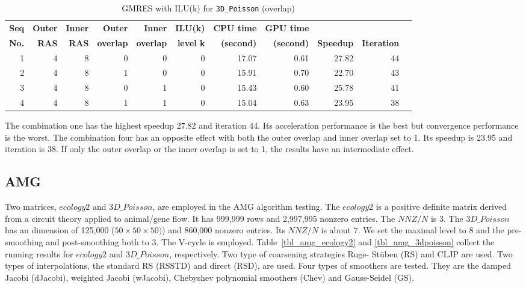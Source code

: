 \documentclass[runningheads,a4paper]{llncs}
\begin{document}
{\begin{table}[!htb]
\centering
\caption{GMRES with ILU(k) for \texttt{3D\_Poisson} (overlap)}
\begin{tabular}{|r|r|r|r|r|r|r|r|r|r|r|} \hline
\bfseries Seq & \bfseries Outer & \bfseries Inner & \bfseries Outer & \bfseries Inner & \bfseries ILU(k) & \bfseries CPU time  & \bfseries GPU time  & \bfseries        & \bfseries  \\
\bfseries No. & \bfseries RAS   & \bfseries RAS & \bfseries overlap & \bfseries overlap & \bfseries level k & \bfseries (second)	& \bfseries (second)  & \bfseries Speedup  & \bfseries Iteration\\ \hline
1	&4	&8	&0	&0	&0	&17.07	&0.61	&27.82	&44\\ \hline
2	&4	&8	&1	&0	&0	&15.91	&0.70	&22.70	&43\\ \hline
3	&4	&8	&0	&1	&0	&15.43	&0.60	&25.78	&41\\ \hline
4	&4	&8	&1	&1	&0	&15.04	&0.63	&23.95	&38\\ \hline
\end{tabular}
\label{tbl_overlap}
\end{table}

The combination one has the highest speedup 27.82 and iteration 44. Its acceleration performance is the best but convergence performance is the worst. The combination four has an opposite effect with both the outer overlap and inner overlap set to 1. Its speedup is 23.95 and iteration is 38. If only the outer overlap or the inner overlap is set to 1, the results have an intermediate effect.

\subsection{AMG}

Two matrices, $ecology2$ and $3D\_Poisson$, are employed in the AMG algorithm testing. The $ecology2$ is a positive definite matrix derived from a circuit theory applied to animal/gene flow. It has 999,999 rows and 2,997,995 nonzero entries. The $NNZ/N$ is 3. The $3D\_Poisson$ has an dimension of 125,000 ($50\times50\times50)$) and 860,000 nonzero entries. Its $NNZ/N$ is about 7. We set the maximal level to 8 and the pre-smoothing and post-smoothing both to 3. The V-cycle is employed. Table~\ref{tbl_amg_ecology2} and \ref{tbl_amg_3dpoisson} collect the running results for $ecology2$ and $3D\_Poisson$, respectively. Two type of coarsening strategies Ruge- St\"{u}ben (RS) and CLJP are used. Two types of interpolations, the standard RS (RSSTD) and direct (RSD), are used. Four types of smoothers are tested. They are the damped Jacobi (dJacobi), weighted Jacobi (wJacobi), Chebyshev polynomial smoothers (Chev) and Gauss-Seidel (GS).

}
\end{document}
